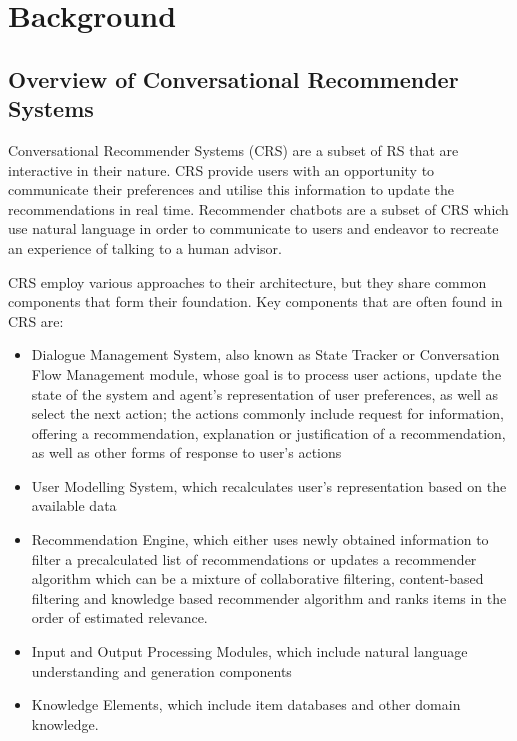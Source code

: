 \chapter{Background}
\label{ch:background}

\section{Overview of Conversational Recommender Systems}

Conversational Recommender Systems (CRS) are a subset of RS that are interactive in their nature. CRS  provide users with an opportunity to communicate their preferences and utilise this information to update the recommendations in real time. Recommender chatbots are a subset of CRS which use natural language in order to communicate to users and endeavor to recreate an experience of talking to a human advisor.

CRS employ various approaches to their architecture, but they share common components that form their foundation. Key components that are often found in CRS are:

\begin{itemize}
    \item Dialogue Management System, also known as State Tracker or Conversation Flow Management module, whose goal is to process user actions, update the state of the system and agent’s representation of user preferences, as well as select the next action; the actions commonly include request for information, offering a recommendation, explanation or justification of a recommendation, as well as other forms of response to user’s actions
    \item User Modelling System, which recalculates user’s representation based on the available data
    \item Recommendation Engine, which either uses newly obtained information to filter a precalculated list of recommendations \citep{sun2018conversational} or updates a recommender algorithm which can be a mixture of collaborative filtering, content-based filtering and knowledge based recommender algorithm \citep{sun2018conversational, christakopoulou2016towards} and ranks items in the order of estimated relevance.
    \item Input and Output Processing Modules, which include natural language understanding and generation components
    \item Knowledge Elements, which include item databases and other domain knowledge.
\end{itemize}

